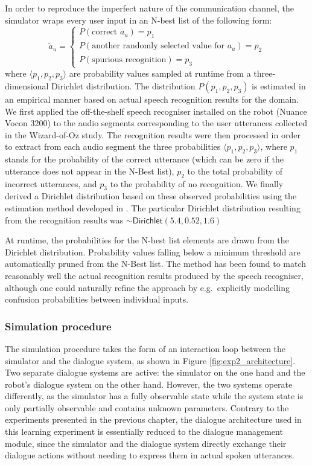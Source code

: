 In order to reproduce the imperfect nature of the communication channel, the simulator wraps every user input in an N-best list of the following form: 
\begin{equation}
\tilde{a}_u = \begin{cases} P(\text{correct } a_u) = p_1 \\ P(\text{another randomly selected value for } a_u) = p_2 \\ P(\text{spurious recognition}) = p_3 \end{cases} \nonumber
\end{equation}
where $\langle p_1, p_2, p_3 \rangle$ are probability values sampled at runtime from a three-dimensional Dirichlet distribution.  The distribution $P(p_1, p_2, p_3)$ is estimated in an empirical manner based on actual speech recognition results for the domain. We first applied the off-the-shelf speech recogniser installed on the robot (Nuance Vocon 3200) to the audio segments corresponding to the user utterances collected in the Wizard-of-Oz study.  The recognition results were then processed in order to extract from each audio segment the three probabilities $\langle p_1, p_2, p_3 \rangle$, where $p_1$ stands for the probability of the correct utterance (which can be zero if the utterance does not appear in the N-Best list), $p_2$ to the total probability of incorrect utterances, and $p_3$ to the probability of no recognition. We finally derived a Dirichlet distribution based on these observed probabilities using the estimation method developed in \cite{minka2003}.  The particular Dirichlet distribution resulting from the recognition results was $\sim\mathsf{Dirichlet}(5.4, 0.52, 1.6)$

At runtime, the probabilities for the N-best list elements are drawn from the Dirichlet distribution. Probability values falling below a minimum threshold are automatically pruned from the N-Best list. The method has been found to match reasonably well the actual recognition results produced by the speech recogniser, although one could naturally refine the approach by e.g.\ explicitly modelling confusion probabilities between individual inputs. 

\subsubsection*{Simulation procedure}
The simulation procedure takes the form of an interaction loop between the simulator and the dialogue system, as shown in Figure \ref{fig:exp2_architecture}.  Two separate dialogue systems are active: the simulator on the one hand and the robot's dialogue system on the other hand.  However, the two systems operate differently, as the simulator has a fully observable state while the system state is only partially observable and contains unknown parameters. Contrary to the experiments presented in the previous chapter, the dialogue architecture used in this learning experiment is essentially reduced to the dialogue management module, since the simulator and the dialogue system directly exchange their dialogue actions without needing to express them in actual spoken utterances.   

